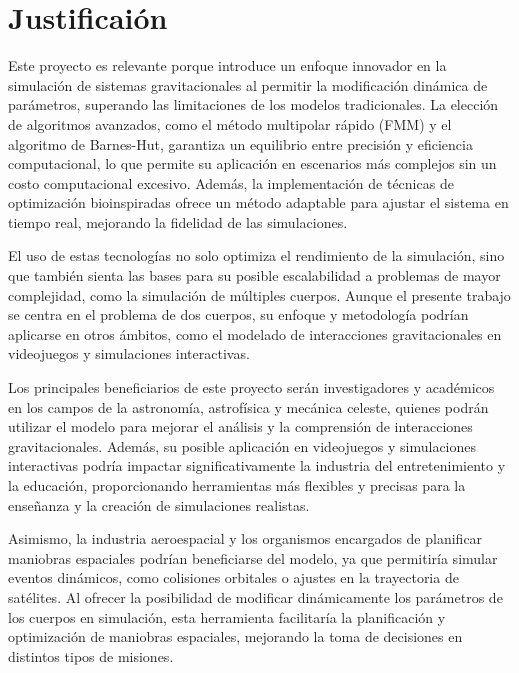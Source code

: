 \section{Justificaión}
Este proyecto es relevante porque introduce un enfoque innovador en la simulación de sistemas gravitacionales al permitir la modificación dinámica de parámetros, superando las limitaciones de los modelos tradicionales. La elección de algoritmos avanzados, como el método multipolar rápido (FMM) y el algoritmo de Barnes-Hut, garantiza un equilibrio entre precisión y eficiencia computacional, lo que permite su aplicación en escenarios más complejos sin un costo computacional excesivo. Además, la implementación de técnicas de optimización bioinspiradas ofrece un método adaptable para ajustar el sistema en tiempo real, mejorando la fidelidad de las simulaciones.

El uso de estas tecnologías no solo optimiza el rendimiento de la simulación, sino que también sienta las bases para su posible escalabilidad a problemas de mayor complejidad, como la simulación de múltiples cuerpos. Aunque el presente trabajo se centra en el problema de dos cuerpos, su enfoque y metodología podrían aplicarse en otros ámbitos, como el modelado de interacciones gravitacionales en videojuegos y simulaciones interactivas.

Los principales beneficiarios de este proyecto serán investigadores y académicos en los campos de la astronomía, astrofísica y mecánica celeste, quienes podrán utilizar el modelo para mejorar el análisis y la comprensión de interacciones gravitacionales. Además, su posible aplicación en videojuegos y simulaciones interactivas podría impactar significativamente la industria del entretenimiento y la educación, proporcionando herramientas más flexibles y precisas para la enseñanza y la creación de simulaciones realistas.

Asimismo, la industria aeroespacial y los organismos encargados de planificar maniobras espaciales podrían beneficiarse del modelo, ya que permitiría simular eventos dinámicos, como colisiones orbitales o ajustes en la trayectoria de satélites. Al ofrecer la posibilidad de modificar dinámicamente los parámetros de los cuerpos en simulación, esta herramienta facilitaría la planificación y optimización de maniobras espaciales, mejorando la toma de decisiones en distintos tipos de misiones.